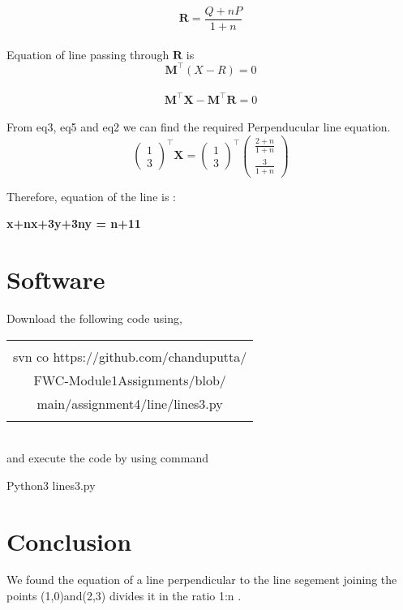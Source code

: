 \documentclass[journal,12pt,twocolumn]{article}
\newcommand{\myvec}[1]{\ensuremath{\begin{pmatrix}#1\end{pmatrix}}}
\let\vec\mathbf
\begin{document}
 \begin{equation}
	\vec{R}=\frac{Q+nP}{1+n}
	 \label{eq-4}
\end{equation}
 \\
Equation of line passing through ${\vec{R}}$ is\\
\begin{equation}
	\vec{M^{\top}}(X-R)=0
	 \label{eq-4}
\end{equation}
\\
\begin{equation}
	 \vec{M^{\top}}
	 \vec{X} - \vec{M^{\top}}
	 \vec{R} = 0
	 \label{eq-5}
\end{equation}
 \\
 From eq3, eq5 and eq2 we can find the required Perpenducular line equation. 
 \begin{equation}
	   \myvec{
  1\\
  3}^{\top}
	 \vec{X}
	 = \myvec{
  1\\
  3}^{\top}\myvec{
  \frac{2+n}{1+n}\\
  \frac{3}{1+n}} 
  \label{eq-5}
\end{equation}

Therefore, equation of the line is :
\begin{center}
    \textbf{x+nx+3y+3ny = n+11}
\end{center}


 
\section{Software}
Download the following code using,
\begin{table}[h]
    \centering
    \begin{tabular}{|c|}
    \hline \\
         svn co https://github.com/chanduputta/ \\FWC-Module1Assignments/blob/\\main/assignment4/line/lines3.py  \\
         \\
\hline
    \end{tabular}
\end{table}
\\
and execute the code by using command
\begin{center}
{Python3  lines3.py}\\
\end{center}

\section{Conclusion}
\begin{center}
We found the equation of a line perpendicular to the line segement joining the points (1,0)and(2,3) divides it in the ratio 1:n .
\end{center}
\end{document}
